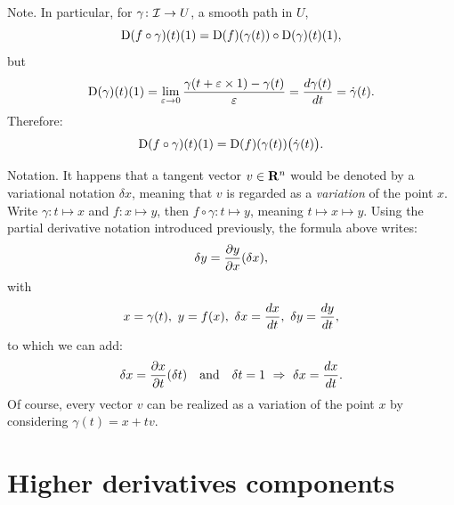 %
\begin{Article}{Note.}{}
  In particular,
  for $\gamma \colon \mathcal{I} \to U$,
  a smooth path in $U$,
  $$%
    \Der(f \circ \gamma)(t)(1) = \Der(f)(\gamma(t)) \circ \Der(\gamma)(t)(1),
    $$%
  but
  $$%
    \Der(\gamma)(t)(1) = \lim_{\epsilon \to 0} {\gamma(t+\epsilon \times 1) - \gamma(t) \over \epsilon} = {d\gamma(t) \over dt} = \dot\gamma(t).
    $$%
  Therefore:
  $$%
    \Der(f \circ \gamma)(t)(1) = \Der(f)(\gamma(t))\big(\dot\gamma(t)\big).
    $$%
\end{Article}
%
\begin{Article}{Notation.}{}
  It happens that a tangent vector $v \in \mathbf{R}^n$ would be denoted by a variational notation $\delta x$,
  meaning that $v$ is regarded as a \emph{variation} of the point $x$.
  Write $\gamma \colon t \mapsto x$ and $f \colon x \mapsto y$,
  then $f \circ \gamma \colon t \mapsto y$,
  meaning $t \mapsto x \mapsto y$.
  Using the partial derivative notation introduced previously,
  the formula above writes:
  $$%
    \delta y = {\partial y \over \partial x}(\delta x),
    $$%
  with
  $$%
    x = \gamma(t),\ y = f(x),\ \delta x = {dx \over dt},\ \delta y = {dy \over dt},
    $$%
  to which we can add:
  $$%
    \delta x = {\partial x \over \partial t} (\delta t)
    \quad \text{and} \quad
    \delta t = 1 \ \Rightarrow \ \delta x = {dx \over dt}.
    $$%
  Of course,
  every vector $v$ can be realized as a variation of the point $x$ by considering $\gamma(t) = x +tv$.
\end{Article}


\section{Higher derivatives components}


